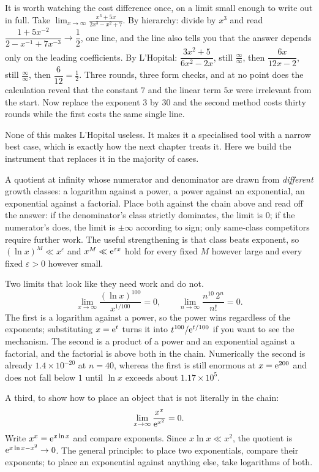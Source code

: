 It is worth watching the cost difference once, on a limit small enough to write out in full. Take $\displaystyle\lim_{x\to\infty}\frac{x^{3}+5x}{2x^{3}-x^{2}+7}$. By hierarchy: divide by $x^{3}$ and read $\dfrac{1+5x^{-2}}{2-x^{-1}+7x^{-3}}\to\dfrac12$, one line, and the line also tells you that the answer depends only on the leading coefficients. By L'Hopital: $\dfrac{3x^{2}+5}{6x^{2}-2x}$, still $\tfrac{\infty}{\infty}$, then $\dfrac{6x}{12x-2}$, still $\tfrac{\infty}{\infty}$, then $\dfrac{6}{12}=\tfrac12$. Three rounds, three form checks, and at no point does the calculation reveal that the constant $7$ and the linear term $5x$ were irrelevant from the start. Now replace the exponent $3$ by $30$ and the second method costs thirty rounds while the first costs the same single line.

None of this makes L'Hopital useless. It makes it a specialised tool with a narrow best case, which is exactly how the next chapter treats it. Here we build the instrument that replaces it in the majority of cases.

\cue A quotient at infinity whose numerator and denominator are drawn from \emph{different} growth classes: a logarithm against a power, a power against an exponential, an exponential against a factorial.
\method Place both against the chain above and read off the answer: if the denominator's class strictly dominates, the limit is $0$; if the numerator's does, the limit is $\pm\infty$ according to sign; only same-class competitors require further work. The useful strengthening is that class beats exponent, so $(\ln x)^{M}\ll x^{\varepsilon}$ and $x^{M}\ll \mathrm{e}^{\varepsilon x}$ hold for every fixed $M$ however large and every fixed $\varepsilon>0$ however small.

\begin{worked}
Two limits that look like they need work and do not.
\[
\lim_{x\to\infty}\frac{(\ln x)^{100}}{x^{1/100}}=0,\qquad
\lim_{n\to\infty}\frac{n^{10}\,2^{n}}{n!}=0.
\]
The first is a logarithm against a power, so the power wins regardless of the exponents; substituting $x=\mathrm{e}^{t}$ turns it into $t^{100}/\mathrm{e}^{t/100}$ if you want to see the mechanism. The second is a product of a power and an exponential against a factorial, and the factorial is above both in the chain. Numerically the second is already $1.4\times10^{-20}$ at $n=40$, whereas the first is still enormous at $x=\mathrm{e}^{200}$ and does not fall below $1$ until $\ln x$ exceeds about $1.17\times10^{5}$.

A third, to show how to place an object that is not literally in the chain:
\[
\lim_{x\to\infty}\frac{x^{x}}{\mathrm{e}^{x^{2}}}=0 .
\]
Write $x^{x}=\mathrm{e}^{x\ln x}$ and compare exponents. Since $x\ln x\ll x^{2}$, the quotient is $\mathrm{e}^{x\ln x-x^{2}}\to0$. The general principle: to place two exponentials, compare their exponents; to place an exponential against anything else, take logarithms of both.
\end{worked}

